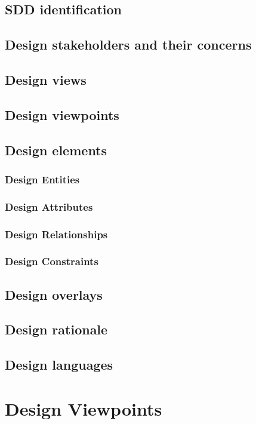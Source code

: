 \documentclass[onecolumn, draftclsnofoot,10pt, compsoc]{IEEEtran}
\begin{document}
\begin{singlespace}
	\subsection{SDD identification}
	\subsection{Design stakeholders and their concerns}
	\subsection{Design views}
	\subsection{Design viewpoints}
	\subsection{Design elements}
		\subsubsection{Design Entities}
		\subsubsection{Design Attributes}
		\subsubsection{Design Relationships}
		\subsubsection{Design Constraints}
	\subsection{Design overlays}
	\subsection{Design rationale}
	\subsection{Design languages}
\section{Design Viewpoints}

\end{singlespace}
\end{document}
